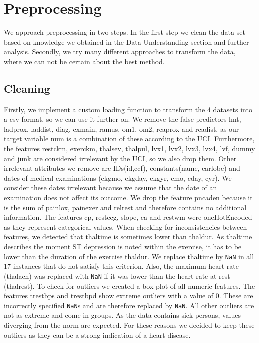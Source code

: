 \section{Preprocessing}
We approach preprocessing in two steps. In the first step we clean the data set based on knowledge we obtained in the Data Understanding section and further analysis. 
Secondly, we try many different approaches to transform the data, where we can not be certain about the best method. 

\subsection{Cleaning}
Firstly, we implement a custom loading function to transform the 4 datasets into a csv format, so we can use it further on.
We remove the false predictors lmt, ladprox, laddist, diag, cxmain, ramus, om1, om2, rcaprox and rcadist, as our target variable num is a combination of these according to the UCI. %
Furthermore, the features restckm, exerckm, thalsev, thalpul, lvx1, lvx2, lvx3, lvx4, lvf, dummy and junk are considered irrelevant by the UCI, so we also drop them. Other irrelevant attributes we remove are IDs(id,ccf), constants(name, earlobe) and dates of medical examinations (ekgmo, ekgday, ekgyr, cmo, cday, cyr). We consider these dates irrelevant because we assume that the date of  an examination does not affect its outcome. 
We drop the feature pncaden because it is the sum of painlox, painexer and relrest and therefore contains no additional information. 
The features cp, restecg, slope, ca and restwm were oneHotEncoded as they represent categorical values.
When checking for inconsistencies between features, we detected that thaltime is sometimes lower than thaldur. As thaltime describes the moment ST depression is noted within the exercise, it has to be lower than the duration of the exercise thaldur. We replace thaltime by \texttt{NaN} in all 17 instances that do not satisfy this criterion. 
Also, the maximum heart rate (thalach) was replaced with \texttt{NaN} if it was lower than the heart rate at rest (thalrest).
To check for outliers we created a box plot of all numeric features. The features trestbps and trestbpd show extreme outliers with a value of 0. These are incorrectly specified \texttt{NaN}s and are therefore replaced by \texttt{NaN}. All other outliers are not as extreme and come in groups. As the data contains sick persons, values diverging from the norm are expected. For these reasons we decided to keep these outliers as they can be a strong indication of a heart disease.
